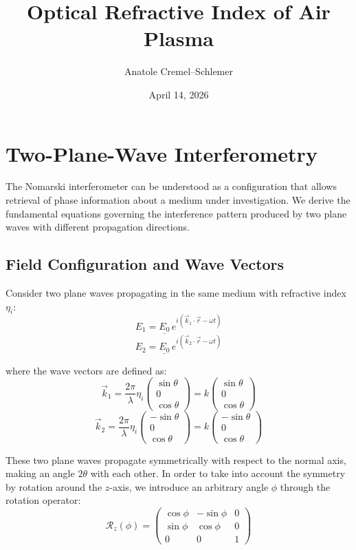 \documentclass[11pt,a4paper]{article}
\title{\textbf{Optical Refractive Index of Air Plasma}}
\author{Anatole Cremel--Schlemer}
\date{April 14, 2026}
\newcommand{\vectIII}[3]{%
    \begin{pmatrix}
    #1 \\
    #2 \\
    #3
    \end{pmatrix}%
}
\begin{document}
\maketitle
\thispagestyle{fancy}


\tableofcontents
\newpage

\section{Two-Plane-Wave Interferometry}

The Nomarski interferometer can be understood as a configuration that allows retrieval of phase information about a medium under investigation. We derive the fundamental equations governing the interference pattern produced by two plane waves with different propagation directions.

\subsection{Field Configuration and Wave Vectors}

Consider two plane waves propagating in the same medium with refractive index $\eta_i$:
\begin{equation}
E_1 = \underline{E_0} \, e^{i(\vec{k}_1 \cdot \vec{r} - \omega t)}
\end{equation}
\begin{equation}
E_2 = \underline{E_0} \, e^{i(\vec{k}_2 \cdot \vec{r} - \omega t)}
\end{equation}

where the wave vectors are defined as:
\begin{equation}
\vec{k}_1 = \frac{2\pi}{\lambda}\eta_i \vectIII{\sin{\theta}}{0}{\cos{\theta}} = k \vectIII{\sin{\theta}}{0}{\cos{\theta}}
\end{equation}
\begin{equation}
\vec{k}_2 = \frac{2\pi}{\lambda}\eta_i \vectIII{-\sin{\theta}}{0}{\cos{\theta}} = k \vectIII{-\sin{\theta}}{0}{\cos{\theta}}
\end{equation}

These two plane waves propagate symmetrically with respect to the normal axis, making an angle $2\theta$ with each other. In order to take into account the symmetry by rotation around the $z$-axis, we introduce an arbitrary angle $\phi$ through the rotation operator:
$$\mathcal{R}_z(\phi) = \begin{pmatrix}
\cos\phi & -\sin\phi & 0 \\
\sin\phi & \cos\phi & 0 \\
0 & 0 & 1
\end{pmatrix}$$
\end{document}
